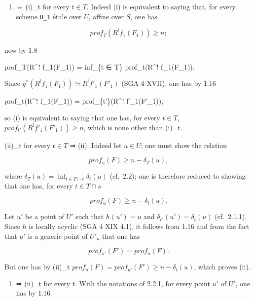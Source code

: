 \documentclass[
]{article}
\newenvironment{Shaded}{}{}
\newcommand{\NormalTok}[1]{#1}
\providecommand{\tightlist}{%
  \setlength{\itemsep}{0pt}\setlength{\parskip}{0pt}}
\begin{document}
\begin{enumerate}
\def\labelenumi{(\roman{enumi})}
\tightlist
\item
  ⇔ (i)\_t for every \(t \in T\). Indeed (i) is equivalent to saying
  that, for every scheme \texttt{U\_1} étale over \(U\), affine over
  \(S\), one has
\end{enumerate}

\[
prof_{T}(R^{!} f_{1}(F_{1})) \geqslant n;
\]

now by 1.8

\begin{Shaded}
\begin{Highlighting}[]
\NormalTok{prof\_T(R\^{}! f\_1(F\_1)) = inf\_\{t ∈ T\} prof\_t(R\^{}! f\_1(F\_1)).}
\end{Highlighting}
\end{Shaded}

Since \(g^{*}(R^{!} f_{1}(F_{1})) \simeq R^{!} f'_{1}(F'_{1})\) (SGA 4
XVII), one has by 1.16

\begin{Shaded}
\begin{Highlighting}[]
\NormalTok{prof\_t(R\^{}! f\_1(F\_1)) = prof\_\{t′\}(R\^{}! f′\_1(F′\_1)),}
\end{Highlighting}
\end{Shaded}

so (i) is equivalent to saying that one has, for every \(t \in T\),
\(prof_{t'}(R^{!} f'_{1}(F'_{1})) \geqslant n\), which is none other
than (i)\_t.

(ii)\_t for every \(t \in T\) ⇒ (ii). Indeed let \(u \in U\); one must
show the relation

\[
prof_{u}(F) \geqslant n - \delta_{T}(u),
\]

where \(\delta_{T}(u) = \inf_{t \in T \cap {s}} \delta_{t}(u)\)
(cf.~2.2); one is therefore reduced to showing that one has, for every
\(t \in T \cap {s}\)

\[
prof_{u}(F) \geqslant n - \delta_{t}(u).
\]

Let \(u'\) be a point of \(U'\) such that \(h(u') = u\) and
\(\delta_{t'}(u') = \delta_{t}(u)\) (cf.~2.1.1). Since \(h\) is locally
acyclic (SGA 4 XIX 4.1), it follows from 1.16 and from the fact that
\(u'\) is a generic point of \(U'_{u}\) that one has

\[
prof_{u'}(F') = prof_{u}(F).
\]

But one has by (ii)\_t
\(prof_{u}(F) = prof_{u'}(F') \geqslant n - \delta_{t}(u)\), which
proves (ii).

\begin{enumerate}
\def\labelenumi{(\roman{enumi})}
\setcounter{enumi}{1}
\tightlist
\item
  ⇒ (ii)\_t for every \(t\). With the notations of 2.2.1, for every
  point \(u'\) of \(U'\), one has by 1.16
\end{enumerate}
\end{document}
